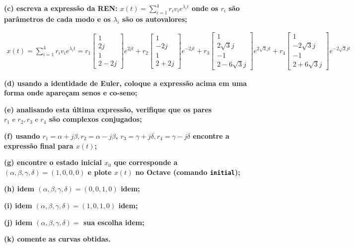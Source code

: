 \documentclass[11pt]{article}
\begin{document}
\textbf{(c) escreva a expressão da REN: $x(t) = \sum_{i=1}^{4} r_i v_i e^{\lambda_i t}$ onde os $r_i$ são parâmetros de cada modo e os $\lambda_i$ são os autovalores;}

\begin{align*}
  x(t) = \sum_{i=1}^{4} r_i v_i e^{\lambda_i t} =
  r_1
  \begin{bmatrix}
    1\\
    2j\\
    1\\
    2 - 2j
  \end{bmatrix}
  e^{2j t} +
  r_2
  \begin{bmatrix}
    1\\
    -2j\\
    1\\
    2 + 2j
  \end{bmatrix}
  e^{-2j t} +
  r_3
  \begin{bmatrix}
    1\\
    2\sqrt{3}j\\
    -1\\
    2 - 6\sqrt{3}j
  \end{bmatrix}
  e^{2\sqrt{3}j t} +
  r_4
  \begin{bmatrix}
    1\\
    -2\sqrt{3}j\\
    -1\\
    2 + 6\sqrt{3}j
  \end{bmatrix}
  e^{-2\sqrt{3}j t}
\end{align*}

\textbf{(d) usando a identidade de Euler, coloque a expressão acima em uma forma onde apareçam senos e co-seno;}

\textbf{(e) analisando esta última expressão, verifique que os pares $r_1 \text{ e } r_2, r_3 \text{ e } r_4$ são complexos conjugados;}

\textbf{(f) usando $r_1 = \alpha + j\beta, r_2 = \alpha - j\beta$, $r_3 = \gamma + j\delta, r_4 = \gamma - j\delta$ encontre a expressão final para $x(t)$;}

\textbf{(g) encontre o estado inicial $x_0$ que corresponde a $(\alpha, \beta, \gamma, \delta) = (1, 0, 0, 0)$ e plote $x(t)$ no Octave (comando \texttt{initial});}

\textbf{(h) idem $(\alpha, \beta, \gamma, \delta) = (0, 0, 1, 0)$ idem;}

\textbf{(i) idem $(\alpha, \beta, \gamma, \delta) = (1, 0, 1, 0)$ idem;}

\textbf{(j) idem $(\alpha, \beta, \gamma, \delta) = $ sua escolha idem;}

\textbf{(k) comente as curvas obtidas.}
\end{document}
